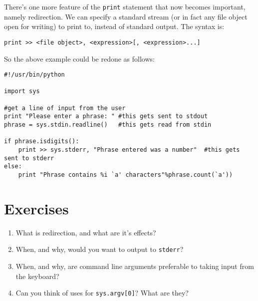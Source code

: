 There's one more feature of the \texttt{print} statement that now becomes important, namely redirection. We can specify a standard stream (or in fact any file object open for writing) to print to, instead of standard output. The syntax is:
\begin{lstlisting}
print >> <file object>, <expression>[, <expression>...]
\end{lstlisting}

So the above example could be redone as follows:
\begin{lstlisting}
#!/usr/bin/python

import sys

#get a line of input from the user
print "Please enter a phrase: "	#this gets sent to stdout
phrase = sys.stdin.readline()	#this gets read from stdin

if phrase.isdigits():
    print >> sys.stderr, "Phrase entered was a number"	#this gets sent to stderr
else:
    print "Phrase contains %i `a' characters"%phrase.count(`a'))
\end{lstlisting}

\section{Exercises}
\begin{enumerate}
	\item What is redirection, and what are it's effects?
	\item When, and why, would you want to output to \texttt{stderr}?
	\item When, and why, are command line arguments preferable to taking    input from the keyboard?
	\item Can you think of uses for 
\texttt{sys.argv[0]}? What are they?
\end{enumerate}
